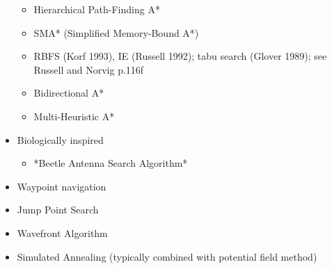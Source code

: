 \begin{itemize}
\begin{itemize}
		\item Hierarchical Path-Finding A* \cite{botea}
		\item SMA* (Simplified Memory-Bound A*)
		\item RBFS (Korf 1993), IE (Russell 1992); tabu search (Glover 1989); see Russell and Norvig p.116f
		\item Bidirectional A*
		\item Multi-Heuristic A* \cite{aine2016}
	\end{itemize}
	\item Biologically inspired
	\begin{itemize}
		\item *Beetle Antenna Search Algorithm* \cite{jiang2017}
	\end{itemize} 

\end{itemize}


\begin{itemize}
	\item Waypoint navigation
	\item Jump Point Search
	\item Wavefront Algorithm
	\item Simulated Annealing (typically combined with potential field method) 
\end{itemize}